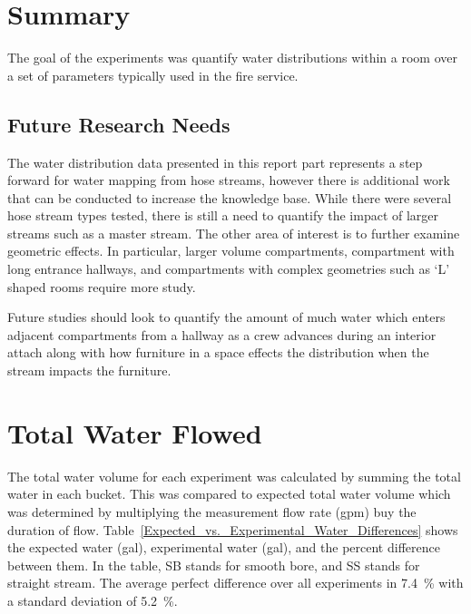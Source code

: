 \documentclass[12pt,oneside]{book}
\begin{document}
\chapter{Summary}
The goal of the experiments was quantify water distributions within a room over a set of parameters typically used in the fire service. 

\section{Future Research Needs}
The water distribution data presented in this report part represents a step forward for water mapping from hose streams, however there is additional work that can be conducted to increase the knowledge base. While there were several hose stream types tested, there is still a need to quantify the impact of larger streams such as a master stream. The other area of interest is to further examine geometric effects. In particular, larger volume compartments, compartment with long entrance hallways, and compartments with complex geometries such as `L' shaped rooms require more study.

Future studies should look to quantify the amount of much water which enters adjacent compartments from a hallway as a crew advances during an interior attach along with how furniture in a space effects the distribution when the stream impacts the furniture. 



\appendix

\chapter{Total Water Flowed}
\label{app:Water_Volume}

The total water volume for each experiment was calculated by summing the total water in each bucket. This was compared to expected total water volume which was determined by multiplying the measurement flow rate (gpm) buy the duration of flow. Table~\ref{Expected_vs._Experimental_Water_Differences} shows the expected water (gal), experimental water (gal), and the percent difference between them. In the table, SB stands for smooth bore, and SS stands for straight stream. The average perfect difference over all experiments in 7.4~\% with a standard deviation of 5.2~\%.
\end{document}
